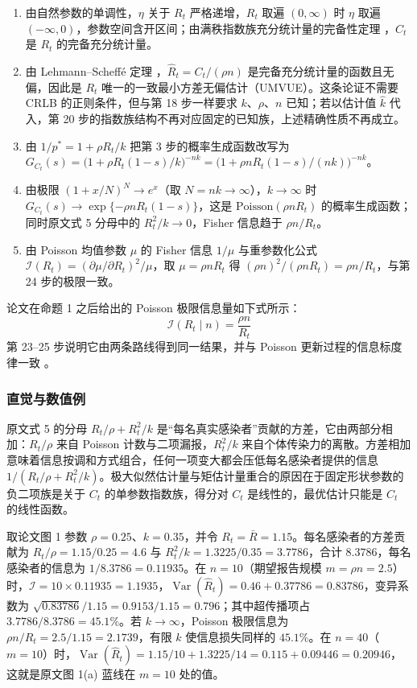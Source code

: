 \begin{enumerate}
\item 由自然参数的单调性，$\eta$ 关于 $R_t$ 严格递增，$R_t$ 取遍 $(0,\infty)$ 时 $\eta$ 取遍 $(-\infty,0)$，参数空间含开区间；由满秩指数族充分统计量的完备性定理 \citep{casella2002statistical}，$C_t$ 是 $R_t$ 的完备充分统计量。
\item 由 Lehmann--Scheffé 定理 \citep{lehmann1998point}，$\widehat{R}_t=C_t/(\rho n)$ 是完备充分统计量的函数且无偏，因此是 $R_t$ 唯一的一致最小方差无偏估计（UMVUE）。这条论证不需要 CRLB 的正则条件，但与第 18 步一样要求 $k$、$\rho$、$n$ 已知；若以估计值 $\hat k$ 代入，第 20 步的指数族结构不再对应固定的已知族，上述精确性质不再成立。
\item 由 $1/p^*=1+\rho R_t/k$ 把第 3 步的概率生成函数改写为 $G_{C_t}(s)=\bigl(1+\rho R_t(1-s)/k\bigr)^{-nk}=\bigl(1+\rho nR_t(1-s)/(nk)\bigr)^{-nk}$。
\item 由极限 $(1+x/N)^{N}\to e^{x}$（取 $N=nk\to\infty$），$k\to\infty$ 时 $G_{C_t}(s)\to\exp\{-\rho nR_t(1-s)\}$，这是 $\mathrm{Poisson}(\rho nR_t)$ 的概率生成函数；同时原文式 5 分母中的 $R_t^2/k\to0$，Fisher 信息趋于 $\rho n/R_t$。
\item 由 Poisson 均值参数 $\mu$ 的 Fisher 信息 $1/\mu$ 与重参数化公式 $\mathcal{I}(R_t)=(\partial\mu/\partial R_t)^2/\mu$，取 $\mu=\rho nR_t$ 得 $(\rho n)^2/(\rho nR_t)=\rho n/R_t$，与第 24 步的极限一致。
\end{enumerate}

论文在命题 1 之后给出的 Poisson 极限信息量如下式所示：
\begin{equation*}
\mathcal{I}(R_t \mid n) = \frac{\rho n}{R_t}
\tag*{原文第 151 行}
\end{equation*}
第 23--25 步说明它由两条路线得到同一结果，并与 Poisson 更新过程的信息标度律一致 \citep{parag2022quantifying}。

\subsubsection{直觉与数值例}

原文式 5 的分母 $R_t/\rho+R_t^2/k$ 是“每名真实感染者”贡献的方差，它由两部分相加：$R_t/\rho$ 来自 Poisson 计数与二项漏报，$R_t^2/k$ 来自个体传染力的离散。方差相加意味着信息按调和方式组合，任何一项变大都会压低每名感染者提供的信息 $1/(R_t/\rho+R_t^2/k)$。极大似然估计量与矩估计量重合的原因在于固定形状参数的负二项族是关于 $C_t$ 的单参数指数族，得分对 $C_t$ 是线性的，最优估计只能是 $C_t$ 的线性函数。

取论文图 1 参数 $\rho=0.25$、$k=0.35$，并令 $R_t=\bar R=1.15$。每名感染者的方差贡献为 $R_t/\rho=1.15/0.25=4.6$ 与 $R_t^2/k=1.3225/0.35=3.7786$，合计 $8.3786$，每名感染者的信息为 $1/8.3786=0.11935$。在 $n=10$（期望报告规模 $m=\rho n=2.5$）时，$\mathcal{I}=10\times0.11935=1.1935$，$\operatorname{Var}(\widehat{R}_t)=0.46+0.37786=0.83786$，变异系数为 $\sqrt{0.83786}/1.15=0.9153/1.15=0.796$；其中超传播项占 $3.7786/8.3786=45.1\%$。若 $k\to\infty$，Poisson 极限信息为 $\rho n/R_t=2.5/1.15=2.1739$，有限 $k$ 使信息损失同样的 $45.1\%$。在 $n=40$（$m=10$）时，$\operatorname{Var}(\widehat{R}_t)=1.15/10+1.3225/14=0.115+0.09446=0.20946$，这就是原文图 1(a) 蓝线在 $m=10$ 处的值。

